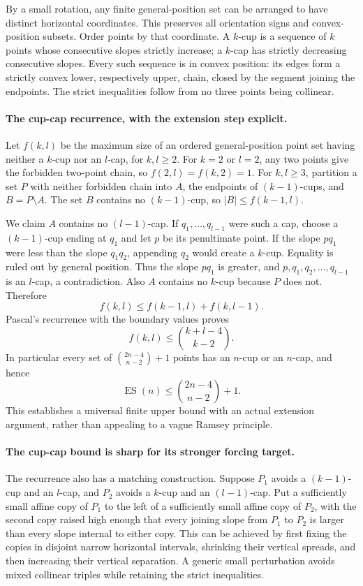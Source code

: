 \documentclass[11pt]{article}
\begin{document}
By a small rotation, any finite general-position set can be arranged
to have distinct horizontal coordinates. This preserves all orientation
signs and convex-position subsets. Order points by that coordinate.
A $k$-cup is a sequence of $k$ points whose consecutive slopes strictly
increase; a $k$-cap has strictly decreasing consecutive slopes.
Every such sequence is in convex position: its edges form a strictly
convex lower, respectively upper, chain, closed by the segment joining
the endpoints. The strict inequalities follow from no three points
being collinear.

\paragraph{The cup-cap recurrence, with the extension step explicit.}
Let $f(k,l)$ be the maximum size of an ordered general-position point
set having neither a $k$-cup nor an $l$-cap, for $k,l\ge2$.
For $k=2$ or $l=2$, any two points give the forbidden two-point chain,
so $f(2,l)=f(k,2)=1$.
For $k,l\ge3$, partition a set $P$ with neither forbidden chain into
$A$, the endpoints of $(k-1)$-cups, and $B=P\setminus A$.
The set $B$ contains no $(k-1)$-cup, so
$|B|\le f(k-1,l)$.

We claim $A$ contains no $(l-1)$-cap. If
$q_1,\ldots,q_{l-1}$ were such a cap, choose a $(k-1)$-cup ending
at $q_1$ and let $p$ be its penultimate point. If the slope $pq_1$
were less than the slope $q_1q_2$, appending $q_2$ would create a
$k$-cup. Equality is ruled out by general position. Thus the slope
$pq_1$ is greater, and
$p,q_1,q_2,\ldots,q_{l-1}$ is an $l$-cap, a contradiction.
Also $A$ contains no $k$-cup because $P$ does not. Therefore
\[
                         f(k,l)\le f(k-1,l)+f(k,l-1).    \tag{1}
\]
Pascal's recurrence with the boundary values proves
\[
                         f(k,l)\le\binom{k+l-4}{k-2}.   \tag{2}
\]
In particular every set of
$\binom{2n-4}{n-2}+1$ points has an $n$-cup or an $n$-cap, and hence
\[
                    \operatorname{ES}(n)\le\binom{2n-4}{n-2}+1.
                                                               \tag{3}
\]
This establishes a universal finite upper bound with an actual
extension argument, rather than appealing to a vague Ramsey principle.

\paragraph{The cup-cap bound is sharp for its stronger forcing target.}
The recurrence also has a matching construction. Suppose $P_1$ avoids
a $(k-1)$-cup and an $l$-cap, and $P_2$ avoids a $k$-cup and an
$(l-1)$-cap. Put a sufficiently small affine copy of $P_1$ to the left
of a sufficiently small affine copy of $P_2$, with the second copy
raised high enough that every joining slope from $P_1$ to $P_2$
is larger than every slope internal to either copy.
This can be achieved by first fixing the copies in disjoint narrow
horizontal intervals, shrinking their vertical spreads, and then
increasing their vertical separation. A generic small perturbation
avoids mixed collinear triples while retaining the strict inequalities.
\end{document}

